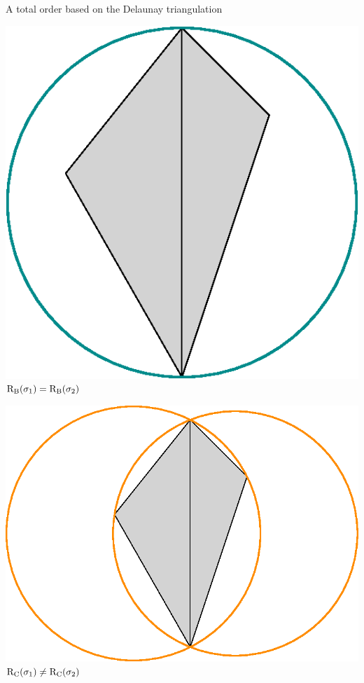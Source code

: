 \begin{frame}{A total order based on the Delaunay triangulation}
	\scriptsize
	\begin{center}
		\begin{minipage}{0.5\linewidth}
			\centering
			\includegraphics[height=0.3\textheight]{order_rseb}\\
			\color{pathblue}$\operatorname{R_B}(\sigma_1) = \operatorname{R_B}(\sigma_2)$	
		\end{minipage}%
		\begin{minipage}{0.5\linewidth}
			\centering
			\includegraphics[height=0.3\textheight]{order_rcirc}\\
			\color{pathorange} $\operatorname{R_C}(\sigma_1) \neq \operatorname{R_C}(\sigma_2)$
		\end{minipage}%
	\end{center}
	

\end{frame}
